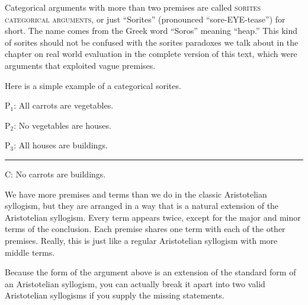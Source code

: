 Categorical arguments with more than two premises are called \textsc{\glspl{sorites categorical argument}}, \label{def:sorites_categorical_arguments} or just ``Sorites'' (pronounced ``sore-EYE-tease'') for short. The name comes from the Greek word ``Soros'' meaning ``heap.'' This kind of sorites should not be confused with the sorites paradoxes we talk about in the chapter on real world evaluation in the complete version of this text, \label{ver_var}  which were arguments that exploited vague premises. 

Here is a simple example of a categorical sorites.

\begin{earg}
\item[P$_1$:] All carrots are vegetables.
\item[P$_2$:] No vegetables are houses. %
\item[P$_3$:] All houses are buildings. 	
\vspace{-.5em}
\item [] \rule{0.3\linewidth}{.5pt} 
\item[C:] No carrots are buildings. 
\end{earg}

We have more premises and terms than we do in the classic Aristotelian syllogism, but they are arranged in a way that is a natural extension of the Aristotelian syllogism. Every term appears twice, except for the major and minor terms of the conclusion. Each premise shares one term with each of the other premises. Really, this is just like a regular Aristotelian syllogism with more middle terms. 

Because the form of the argument above is an extension of the standard form of an Aristotelian syllogism, you can actually break it apart into two valid Aristotelian syllogisms if you supply the missing statements.


